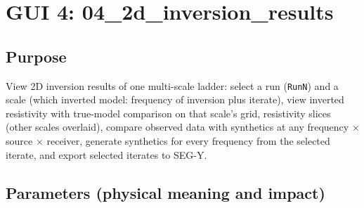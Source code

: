 \documentclass[11pt,a4paper]{article}
\begin{document}
\section{GUI 4: 04\_2d\_inversion\_results}

\subsection{Purpose}

View 2D inversion results of one multi-scale ladder: select a run (\texttt{RunN}) and a scale (which inverted model: frequency of inversion plus iterate), view inverted resistivity with true-model comparison on that scale's grid, resistivity slices (other scales overlaid), compare observed data with synthetics at any frequency $\times$ source $\times$ receiver, generate synthetics for every frequency from the selected iterate, and export selected iterates to SEG-Y.

\subsection{Parameters (physical meaning and impact)}
\end{document}
